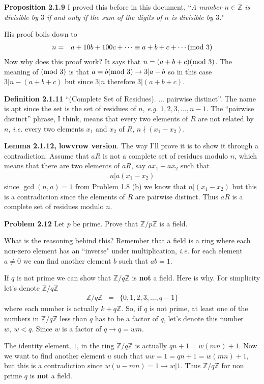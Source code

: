 \documentclass[aps,preprint,preprintnumbers,nofootinbib,showpacs,prd]{revtex4-1}
\newcommand{\ie}{{\it i.e.} }
\newcommand{\eg}{{\it e.g.} }
\newcommand{\nbea}{\begin{eqnarray*}}
\newcommand{\neea}{\end{eqnarray*}}
\begin{document}
{\bf Proposition 2.1.9} I proved this before in this document, ``{\it A number $n \in \mathbb{Z}$ is divisible by $3$ if and only if the sum of the digits of $n$ is divisible by $3$.}"

His proof boils down to
%
\nbea
n & = & a + 10b + 100c + \dots \equiv a +b+ c + \cdots ({\rm mod~} 3)
\neea
%
Now why does this proof work? It says that $n = (a+b+c)({\rm mod~} 3)$. The meaning of $({\rm mod~} 3)$ is that $a = b ({\rm mod~} 3) \to 3 | a-b$ so in this case $3 | n - (a+b+c)$ but since $3|n$ therefore $3|(a+b+c).$

{\bf Definition 2.1.11} ``(Complete Set of Residues). $\dots$ pairwise distinct''. The name is apt since the set is the set of residues of $n$, \eg $1,2,3,\dots,n-1$. The ``pairwise distinct'' phrase, I think, means that every two elements of $R$ are not related by $n$, \ie every two elements $x_1$ and $x_2$ of $R$, $n \nmid (x_1 - x_2)$.

{\bf Lemma 2.1.12, lowvrow version}. The way I'll prove it is to show it through a contradiction. Assume that $aR$ is not a complete set of residues modulo $n$, which means that there are two elements of $aR$, say $ax_1 - ax_2$ such that
%
\nbea
n | a(x_1 - x_2)
\neea
%
since $\gcd(n,a) = 1$ from Problem 1.8 (b) we know that $n|(x_1 - x_2)$ but this is a contradiction since the elements of $R$ are pairwise distinct. Thus $aR$ is a complete set of residues modulo $n$.

{\bf Problem 2.12} Let $p$ be prime. Prove that $\mathbb{Z}/p\mathbb{Z}$ is a field.

What is the reasoning behind this? Remember that a field is a ring where each non-zero element has an ``inverse" under multiplication, \ie for each element $a \neq 0$ we can find another element $b$ such that $ab=1$.

If $q$ is not prime we can show that $\mathbb{Z}/q\mathbb{Z}$ is {\bf not} a field. Here is why. For simplicity let's denote $\mathbb{Z}/q\mathbb{Z}$
%
\nbea
\mathbb{Z}/q\mathbb{Z} & = & \{0,1,2,3, \dots, q-1\}
\neea
%
where each number is actually $k + q\mathbb{Z}$. So, if $q$ is not prime, at least one of the numbers in $\mathbb{Z}/q\mathbb{Z}$ less than $q$ has to be a factor of $q$, let's denote this number $w,~w < q$. Since $w$ is a factor of $q \to q = w m$.

The identity element, $1$, in the ring $\mathbb{Z}/q\mathbb{Z}$ is actually $qn + 1 = w(mn) + 1$. Now we want to find another element $u$ such that $uw = 1 = qn + 1 = w(mn) + 1$, but this is a contradiction since $w (u - mn) = 1 \to w|1$. Thus $\mathbb{Z}/q\mathbb{Z}$ for non prime $q$ is {\bf not} a field.
\end{document}
